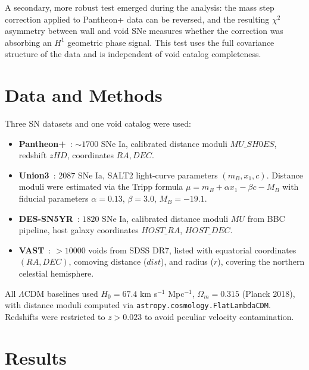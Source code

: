 \documentclass[11pt]{article}
\begin{document}
A secondary, more robust test emerged during the analysis: the
mass step correction applied to Pantheon+ data can be reversed,
and the resulting $\chi^2$ asymmetry between wall and void SNe
measures whether the correction was absorbing an $H^1$ geometric
phase signal. This test uses the full covariance structure of the
data and is independent of void catalog completeness.

\section{Data and Methods}
\label{sec:data}

Three SN datasets and one void catalog were used:

\begin{itemize}
  \item \textbf{Pantheon+}~\cite{PantheonPlus}: $\sim 1700$ SNe Ia,
    calibrated distance moduli $MU\_SH0ES$, redshift $zHD$,
    coordinates $RA, DEC$.
  \item \textbf{Union3}~\cite{Union3}: $2087$ SNe Ia, SALT2 light-curve
    parameters $(m_B, x_1, c)$. Distance moduli were estimated via the
    Tripp formula $\mu = m_B + \alpha x_1 - \beta c - M_B$ with
    fiducial parameters $\alpha = 0.13$, $\beta = 3.0$, $M_B = -19.1$.
  \item \textbf{DES-SN5YR}~\cite{DES}: $1820$ SNe Ia, calibrated
    distance moduli $MU$ from BBC pipeline, host galaxy coordinates
    $HOST\_RA$, $HOST\_DEC$.
  \item \textbf{VAST}~\cite{VAST}: $>10000$ voids from
    SDSS DR7, listed with equatorial coordinates $(RA, DEC)$,
    comoving distance ($dist$), and radius ($r$), covering the
    northern celestial hemisphere.
\end{itemize}

All $\Lambda$CDM baselines used $H_0 = 67.4$ km s$^{-1}$ Mpc$^{-1}$,
$\Omega_m = 0.315$ (Planck 2018), with distance moduli computed via
\texttt{astropy.cosmology.FlatLambdaCDM}. Redshifts were restricted
to $z > 0.023$ to avoid peculiar velocity contamination.

\section{Results}
\label{sec:results}
\end{document}
